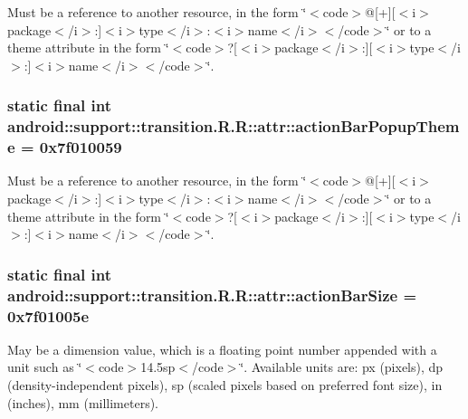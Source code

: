 Must be a reference to another resource, in the form \char`\"{}$<$code$>$@\mbox{[}+\mbox{]}\mbox{[}$<$i$>$package$<$/i$>$:\mbox{]}$<$i$>$type$<$/i$>$:$<$i$>$name$<$/i$>$$<$/code$>$\char`\"{} or to a theme attribute in the form \char`\"{}$<$code$>$?\mbox{[}$<$i$>$package$<$/i$>$:\mbox{]}\mbox{[}$<$i$>$type$<$/i$>$:\mbox{]}$<$i$>$name$<$/i$>$$<$/code$>$\char`\"{}. \hypertarget{classandroid_1_1support_1_1transition_1_1_r_1_1attr_fbbf1b57d1e32c6c25ec3c1b5ece1403}{
\subsubsection[{actionBarPopupTheme}]{\setlength{\rightskip}{0pt plus 5cm}static final int android::support::transition.R.R::attr::actionBarPopupTheme = 0x7f010059}}
\label{classandroid_1_1support_1_1transition_1_1_r_1_1attr_fbbf1b57d1e32c6c25ec3c1b5ece1403}


Must be a reference to another resource, in the form \char`\"{}$<$code$>$@\mbox{[}+\mbox{]}\mbox{[}$<$i$>$package$<$/i$>$:\mbox{]}$<$i$>$type$<$/i$>$:$<$i$>$name$<$/i$>$$<$/code$>$\char`\"{} or to a theme attribute in the form \char`\"{}$<$code$>$?\mbox{[}$<$i$>$package$<$/i$>$:\mbox{]}\mbox{[}$<$i$>$type$<$/i$>$:\mbox{]}$<$i$>$name$<$/i$>$$<$/code$>$\char`\"{}. \hypertarget{classandroid_1_1support_1_1transition_1_1_r_1_1attr_d44b3ff14ffce19dfdedcd2a9cd8a03f}{
\subsubsection[{actionBarSize}]{\setlength{\rightskip}{0pt plus 5cm}static final int android::support::transition.R.R::attr::actionBarSize = 0x7f01005e}}
\label{classandroid_1_1support_1_1transition_1_1_r_1_1attr_d44b3ff14ffce19dfdedcd2a9cd8a03f}


May be a dimension value, which is a floating point number appended with a unit such as \char`\"{}$<$code$>$14.5sp$<$/code$>$\char`\"{}. Available units are: px (pixels), dp (density-independent pixels), sp (scaled pixels based on preferred font size), in (inches), mm (millimeters). 

